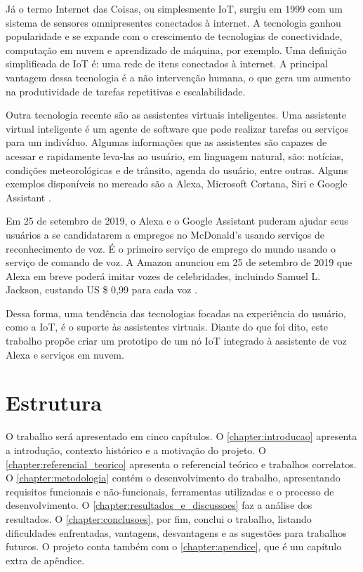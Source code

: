 Já o termo Internet das Coisas, ou simplesmente IoT, surgiu em 1999 com um sistema de sensores omnipresentes conectados à internet. A tecnologia ganhou popularidade e se expande com o crescimento de tecnologias de conectividade, computação em nuvem e aprendizado de máquina, por exemplo. Uma definição simplificada de IoT é: uma rede de itens conectados à internet. A principal vantagem dessa tecnologia é a não intervenção humana, o que gera um aumento na produtividade de tarefas repetitivas e escalabilidade.

Outra tecnologia recente são as assistentes virtuais inteligentes. Uma assistente virtual inteligente é um agente de software que pode realizar tarefas ou serviços para um indivíduo. Algumas informações que as assistentes são capazes de acessar e rapidamente leva-las ao usuário, em linguagem natural, são: notícias, condições meteorológicas e de trânsito, agenda do usuário, entre outras. Alguns exemplos disponíveis no mercado são a Alexa, Microsoft Cortana, Siri e Google Assistant \cite{ref:001}.

Em 25 de setembro de 2019, o Alexa e o Google Assistant puderam ajudar seus usuários a se candidatarem a empregos no McDonald's usando serviços de reconhecimento de voz. É o primeiro serviço de emprego do mundo usando o serviço de comando de voz. A Amazon anunciou em 25 de setembro de 2019 que Alexa em breve poderá imitar vozes de celebridades, incluindo Samuel L. Jackson, custando US \$ 0,99 para cada voz \cite{ref:002}.

Dessa forma, uma tendência das tecnologias focadas na experiência do usuário, como a IoT, é o suporte às assistentes virtuais. Diante do que foi dito, este trabalho propõe criar um prototipo de um nó IoT integrado à assistente de voz Alexa e serviços em nuvem.

\section{Estrutura}
O trabalho será apresentado em cinco capítulos. O \autoref{chapter:introducao} apresenta a introdução, contexto histórico e a motivação do projeto. O \autoref{chapter:referencial_teorico} apresenta o referencial teórico e trabalhos correlatos. O \autoref{chapter:metodologia} contém o desenvolvimento do trabalho, apresentando requisitos funcionais e não-funcionais, ferramentas utilizadas e o processo de desenvolvimento. O \autoref{chapter:resultados_e_discussoes} faz a análise dos resultados. O \autoref{chapter:conclusoes}, por fim, conclui o trabalho, listando dificuldades enfrentadas, vantagens, desvantagens e as sugestões para trabalhos futuros. O projeto conta também com o \autoref{chapter:apendice}, que é um capítulo extra de apêndice.
